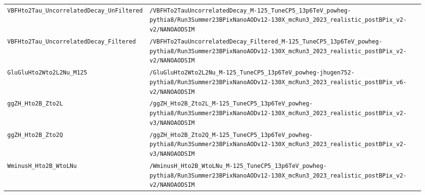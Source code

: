 \begin{longtable}{@{}>{\RaggedRight\arraybackslash}p{} >{\RaggedRight\arraybackslash}p{}@{}}
\addlinespace[2pt]
\texttt{VBFHto2Tau\_\allowbreak{}UncorrelatedDecay\_\allowbreak{}UnFiltered} & \texttt{/\allowbreak{}VBFHTo2TauUncorrelatedDecay\_\allowbreak{}M-\allowbreak{}125\_\allowbreak{}TuneCP5\_\allowbreak{}13p6TeV\_\allowbreak{}powheg-\allowbreak{}pythia8/\allowbreak{}Run3Summer23BPixNanoAODv12-\allowbreak{}130X\_\allowbreak{}mcRun3\_\allowbreak{}2023\_\allowbreak{}realistic\_\allowbreak{}postBPix\_\allowbreak{}v2-\allowbreak{}v2/\allowbreak{}NANOAODSIM} \\
\addlinespace[2pt]
\texttt{VBFHto2Tau\_\allowbreak{}UncorrelatedDecay\_\allowbreak{}Filtered} & \texttt{/\allowbreak{}VBFHTo2TauUncorrelatedDecay\_\allowbreak{}Filtered\_\allowbreak{}M-\allowbreak{}125\_\allowbreak{}TuneCP5\_\allowbreak{}13p6TeV\_\allowbreak{}powheg-\allowbreak{}pythia8/\allowbreak{}Run3Summer23BPixNanoAODv12-\allowbreak{}130X\_\allowbreak{}mcRun3\_\allowbreak{}2023\_\allowbreak{}realistic\_\allowbreak{}postBPix\_\allowbreak{}v2-\allowbreak{}v2/\allowbreak{}NANOAODSIM} \\
\addlinespace[2pt]
\texttt{GluGluHto2Wto2L2Nu\_\allowbreak{}M125} & \texttt{/\allowbreak{}GluGluHto2Wto2L2Nu\_\allowbreak{}M-\allowbreak{}125\_\allowbreak{}TuneCP5\_\allowbreak{}13p6TeV\_\allowbreak{}powheg-\allowbreak{}jhugen752-\allowbreak{}pythia8/\allowbreak{}Run3Summer23BPixNanoAODv12-\allowbreak{}130X\_\allowbreak{}mcRun3\_\allowbreak{}2023\_\allowbreak{}realistic\_\allowbreak{}postBPix\_\allowbreak{}v6-\allowbreak{}v2/\allowbreak{}NANOAODSIM} \\
\addlinespace[2pt]
\texttt{ggZH\_\allowbreak{}Hto2B\_\allowbreak{}Zto2L} & \texttt{/\allowbreak{}ggZH\_\allowbreak{}Hto2B\_\allowbreak{}Zto2L\_\allowbreak{}M-\allowbreak{}125\_\allowbreak{}TuneCP5\_\allowbreak{}13p6TeV\_\allowbreak{}powheg-\allowbreak{}pythia8/\allowbreak{}Run3Summer23BPixNanoAODv12-\allowbreak{}130X\_\allowbreak{}mcRun3\_\allowbreak{}2023\_\allowbreak{}realistic\_\allowbreak{}postBPix\_\allowbreak{}v2-\allowbreak{}v3/\allowbreak{}NANOAODSIM} \\
\addlinespace[2pt]
\texttt{ggZH\_\allowbreak{}Hto2B\_\allowbreak{}Zto2Q} & \texttt{/\allowbreak{}ggZH\_\allowbreak{}Hto2B\_\allowbreak{}Zto2Q\_\allowbreak{}M-\allowbreak{}125\_\allowbreak{}TuneCP5\_\allowbreak{}13p6TeV\_\allowbreak{}powheg-\allowbreak{}pythia8/\allowbreak{}Run3Summer23BPixNanoAODv12-\allowbreak{}130X\_\allowbreak{}mcRun3\_\allowbreak{}2023\_\allowbreak{}realistic\_\allowbreak{}postBPix\_\allowbreak{}v2-\allowbreak{}v3/\allowbreak{}NANOAODSIM} \\
\addlinespace[2pt]
\texttt{WminusH\_\allowbreak{}Hto2B\_\allowbreak{}WtoLNu} & \texttt{/\allowbreak{}WminusH\_\allowbreak{}Hto2B\_\allowbreak{}WtoLNu\_\allowbreak{}M-\allowbreak{}125\_\allowbreak{}TuneCP5\_\allowbreak{}13p6TeV\_\allowbreak{}powheg-\allowbreak{}pythia8/\allowbreak{}Run3Summer23BPixNanoAODv12-\allowbreak{}130X\_\allowbreak{}mcRun3\_\allowbreak{}2023\_\allowbreak{}realistic\_\allowbreak{}postBPix\_\allowbreak{}v2-\allowbreak{}v2/\allowbreak{}NANOAODSIM} \\

\end{longtable}
